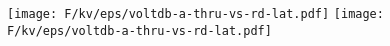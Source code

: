 \def \hmina {\hspace{-0.1in}}
\def \hminb {\hspace{-0.1in}}

\def \fgw {1.78in}
\def \fgh {1.085in}


\begin{figure}[t!]
\centerline{
\hmina
\texttt{[image: F/kv/eps/voltdb-a-thru-vs-rd-lat.pdf]}
\hminb
\texttt{[image: F/kv/eps/voltdb-a-thru-vs-rd-lat.pdf]}
}

\vminten


\vminfifteen

\end{figure}

